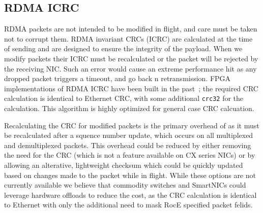 
\subsection{RDMA ICRC}

RDMA packets are not intended to be modified in flight, and care must
be taken not to corrupt them. RDMA invariant CRCs (ICRC) are
calculated at the time of sending and are designed to ensure the
integrity of the payload. When we modify packets their ICRC must be
recalculated or the packet will be rejected by the receiving NIC. Such
an error would cause an extreme performance hit as any dropped packet
triggers a timeout, and go back n retransmission.  FPGA
implementations of RDMA ICRC have been built in the
past~\cite{Mansour_2019}; the required CRC calculation is identical to
Ethernet CRC, with some additional \texttt{crc32} for the
calculation. This algorithm is highly optimized for general case CRC
calcuation.

Recalculating the CRC for modified packets is the primary overhead
of {\sword} as it must be recalculated after a squence number
update, which occurs on all multiplexed and demultiplexed
packets. This overhead could be reduced by either removing the need
for the CRC (which is not a feature available on CX series NICs) or by
allowing an alterative, lightweight checksum which could be quickly
updated based on changes made to the packet while in flight. While
these options are not currently available we believe that commodity
switches and SmartNICs could leverage hardware offloads to reduce the
cost, as the CRC calculation is identical to Ethernet with only the
additional need to mask RocE specified packet felids.

